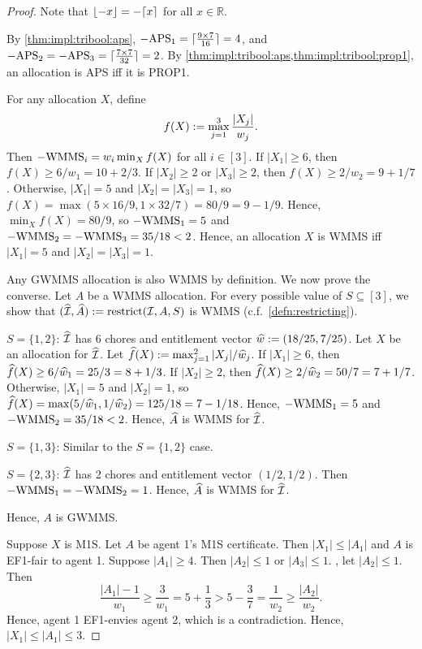 \begin{proof}
Note that $\lfloor -x \rfloor = -\lceil x \rceil$ for all $x \in \mathbb{R}$.

By \cref{thm:impl:tribool:aps}, $-\mathrm{APS}_1 = \lceil \frac{9 \times 7}{16} \rceil = 4$,
and $-\mathrm{APS}_2 = -\mathrm{APS}_3 = \lceil \frac{7 \times 7}{32} \rceil = 2$.
By \cref{thm:impl:tribool:aps,thm:impl:tribool:prop1},
an allocation is APS iff it is PROP1.

For any allocation $X$, define
\[ f(X) := \max_{j=1}^3 \frac{|X_j|}{w_j}. \]
Then $-\mathrm{WMMS}_i = w_i\min_X f(X)$ for all $i \in [3]$.
If $|X_1| \ge 6$, then $f(X) \ge 6/w_1 = 10 + 2/3$.
If $|X_2| \ge 2$ or $|X_3| \ge 2$, then $f(X) \ge 2/w_2 = 9 + 1/7$.
Otherwise, $|X_1| = 5$ and $|X_2| = |X_3| = 1$,
so $f(X) = \max(5 \times 16/9, 1 \times 32/7) = 80/9 = 9 - 1/9$.
Hence, $\min_X f(X) = 80/9$, so $-\mathrm{WMMS}_1 = 5$ and $-\mathrm{WMMS}_2 = -\mathrm{WMMS}_3 = 35/18 < 2$.
Hence, an allocation $X$ is WMMS iff $|X_1| = 5$ and $|X_2| = |X_3| = 1$.

Any GWMMS allocation is also WMMS by definition. We now prove the converse.
Let $A$ be a WMMS allocation. For every possible value of $S \subseteq [3]$,
we show that $(\widehat{\mathcal{I}}, \widehat{A}) := \operatorname{restrict}(\mathcal{I}, A, S)$ is WMMS
(c.f.~\cref{defn:restricting}).
\begin{tightenum}
\item $S = \{1, 2\}$:
    $\widehat{\mathcal{I}}$ has 6 chores and entitlement vector $\widehat{w} := (18/25, 7/25)$.
    Let $X$ be an allocation for $\widehat{\mathcal{I}}$.
    Let $\widehat{f}(X) := \max_{j=1}^2 |X_j|/\widehat{w}_j$.
    If $|X_1| \ge 6$, then $\widehat{f}(X) \ge 6/\widehat{w}_1 = 25/3 = 8 + 1/3$.
    If $|X_2| \ge 2$, then $\widehat{f}(X) \ge 2/\widehat{w}_2 = 50/7 = 7 + 1/7$.
    Otherwise, $|X_1| = 5$ and $|X_2| = 1$, so
    $\widehat{f}(X) = \max(5/\widehat{w}_1, 1/\widehat{w}_2) = 125/18 = 7 - 1/18$.
    Hence, $-\mathrm{WMMS}_1 = 5$ and $-\mathrm{WMMS}_2 = 35/18 < 2$.
    Hence, $\widehat{A}$ is WMMS for $\widehat{\mathcal{I}}$.
\item $S = \{1, 3\}$:
    Similar to the $S = \{1, 2\}$ case.
\item $S = \{2, 3\}$:
    $\widehat{\mathcal{I}}$ has 2 chores and entitlement vector $(1/2, 1/2)$.
    Then $-\mathrm{WMMS}_1 = -\mathrm{WMMS}_2 = 1$.
    Hence, $\widehat{A}$ is WMMS for $\widehat{\mathcal{I}}$.
\end{tightenum}
Hence, $A$ is GWMMS.

Suppose $X$ is M1S. Let $A$ be agent 1's M1S certificate.
Then $|X_1| \le |A_1|$ and $A$ is EF1-fair to agent 1.
Suppose $|A_1| \ge 4$. Then $|A_2| \le 1$ or $|A_3| \le 1$. \WLoG{}, let $|A_2| \le 1$. Then
\[ \frac{|A_1|-1}{w_1} \ge \frac{3}{w_1} = 5 + \frac{1}{3} > 5 - \frac{3}{7} = \frac{1}{w_2} \ge \frac{|A_2|}{w_2}. \]
Hence, agent 1 EF1-envies agent 2, which is a contradiction.
Hence, $|X_1| \le |A_1| \le 3$.


\end{proof}
